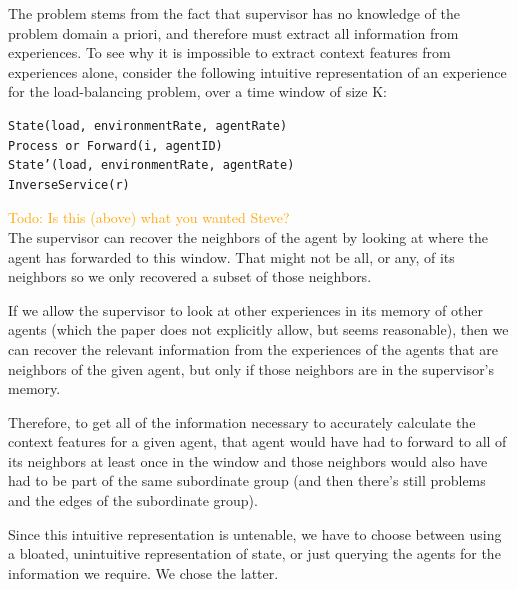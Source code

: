 \documentclass[letterpaper]{article}
\newcommand\todo[1]{\textcolor{orange}{Todo: #1}}
\begin{document}
The problem stems from the fact that supervisor has no knowledge of the problem domain a priori, and therefore must extract all information from experiences. To see why it is impossible to extract context features from experiences alone, consider the following intuitive representation of an experience for the load-balancing problem, over a time window of size K:
\begin{lstlisting}
State(load, environmentRate, agentRate)
Process or Forward(i, agentID)
State’(load, environmentRate, agentRate)
InverseService(r)
\end{lstlisting}
\todo{Is this (above) what you wanted Steve?}\\
The supervisor can recover the neighbors of the agent by looking at where the agent has forwarded to this window.  That might not be all, or any, of its neighbors so we only recovered a subset of those neighbors.

If we allow the supervisor to look at other experiences in its memory of other agents (which the paper does not explicitly allow, but seems reasonable), then we can recover the relevant information from the experiences of the agents that are neighbors of the given agent, but only if those neighbors are in the supervisor’s memory.

Therefore, to get all of the information necessary to accurately calculate the context features for a given agent, that agent would have had to forward to all of its neighbors at least once in the window and those neighbors would also have had to be part of the same subordinate group (and then there’s still problems and the edges of the subordinate group).

Since this intuitive representation is untenable, we have to choose between using a bloated, unintuitive representation of state, or just querying the agents for the information we require.  We chose the latter.
\end{document}
